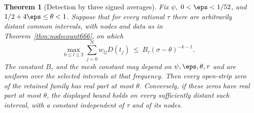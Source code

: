\documentclass[a4paper,11pt]{article}
\newtheorem{theorem}[proposition]{Theorem}
\theoremstyle{definition}
\theoremstyle{remark}
\numberwithin{equation}{section}
\begin{document}
\begin{theorem}[Detection by three signed averages]
\leavevmode\label{thm:threeaverages667}
Fix \(\psi\), \(0<\eps<1/52\), and \(1/2+4\eps\le\theta<1\).
Suppose that for every rational \(\tau\) there are arbitrarily
distant common intervals, with nodes and data as in
Theorem~\ref{thm:nodecount666}, on which
\[
 \max_{0\le l\le2}\sum_{j=0}^N w_{lj}D(t_j)
     \ \le\ B_\tau(\sigma-\theta)^{-k-1}.
\]
The constant \(B_\tau\) and the mesh constant may depend on
\(\psi,\eps,\theta,\tau\) and are uniform over the selected
intervals at that frequency. Then every open-strip zero of the
retained family has real part at most \(\theta\).
Conversely, if these zeros have real part at most \(\theta\),
the displayed bound holds on every sufficiently distant such
interval, with a constant independent of \(\tau\) and of its nodes.
\end{theorem}
\end{document}
